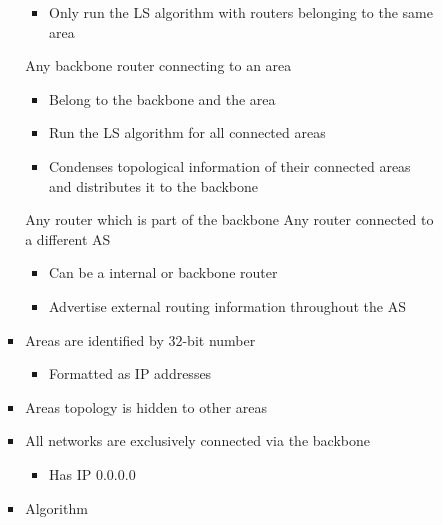 \begin{itemize}
\begin{itemize}
\begin{itemize}
\begin{itemize}
                            \begin{itemize}
                                \item Only run the LS algorithm with routers belonging to the same area
                            \end{itemize}
                         Any backbone router connecting to an area
                            \begin{itemize}
                                \item Belong to the backbone and the area
                                \item Run the LS algorithm for all connected areas
                                \item Condenses topological information of their connected areas and distributes it to the backbone
                            \end{itemize}
                         Any router which is part of the backbone
                         Any router connected to a different AS
                            \begin{itemize}
                                \item Can be a internal or backbone router
                                \item Advertise external routing information throughout the AS
                            \end{itemize}
                        \item Areas are identified by $32$-bit number
                            \begin{itemize}
                                \item Formatted as IP addresses
                            \end{itemize}
                        \item Areas topology is hidden to other areas
                        \item All networks are exclusively connected via the backbone
                            \begin{itemize}
                                \item Has IP $0.0.0.0$
                            \end{itemize}
                        \item Algorithm
                            \begin{itemize}

\end{itemize}
\end{itemize}
\end{itemize}
\end{itemize}
\end{itemize}
